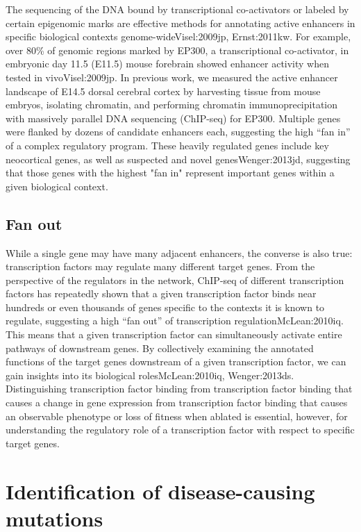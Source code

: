 The sequencing of the DNA bound by transcriptional co-activators or labeled by certain epigenomic marks are effective methods for annotating active enhancers in specific biological contexts genome-wide{Visel:2009jp, Ernst:2011kw}. For example, over 80\% of genomic regions marked by EP300, a transcriptional co-activator, in embryonic day 11.5 (E11.5) mouse forebrain showed enhancer activity when tested in vivo{Visel:2009jp}. In previous work, we measured the active enhancer landscape of E14.5 dorsal cerebral cortex by harvesting tissue from mouse embryos, isolating chromatin, and performing chromatin immunoprecipitation with massively parallel DNA sequencing (ChIP-seq) for EP300. Multiple genes were flanked by dozens of candidate enhancers each, suggesting the high “fan in” of a complex regulatory program. These heavily regulated genes include key neocortical genes, as well as suspected and novel genes{Wenger:2013jd}, suggesting that those genes with the highest "fan in" represent important genes within a given biological context.

\subsection{Fan out}

While a single gene may have many adjacent enhancers, the converse is also true: transcription factors may regulate many different target genes. From the perspective of the regulators in the network, ChIP-seq of different transcription factors has repeatedly shown that a given transcription factor binds near hundreds or even thousands of genes specific to the contexts it is known to regulate, suggesting a high “fan out” of transcription regulation{McLean:2010iq}. This means that a given transcription factor can simultaneously activate entire pathways of downstream genes. By collectively examining the annotated functions of the target genes downstream of a given transcription factor, we can gain insights into its biological roles{McLean:2010iq, Wenger:2013ds}. Distinguishing transcription factor binding from transcription factor binding that causes a change in gene expression from transcription factor binding that causes an observable phenotype or loss of fitness when ablated is essential, however, for understanding the regulatory role of a transcription factor with respect to specific target genes.

\section{Identification of disease-causing mutations}

